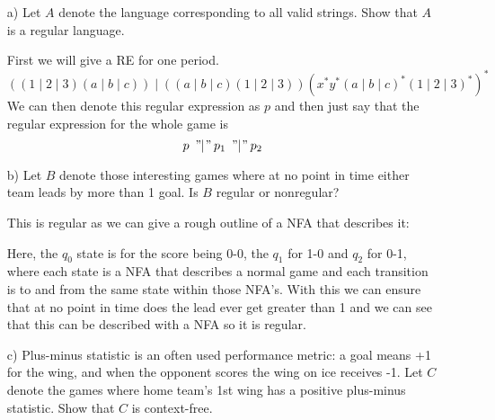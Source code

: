 \documentclass{article}
\begin{document}
	\begin{itemize}
		\item[a)] Let $A$ denote the language corresponding to all valid 
			strings. Show that $A$ is a regular language. 

			First we will give a RE for one period.
			\[
				((1\mid 2\mid 3)(a\mid b\mid c))\mid((a\mid b\mid c)(1\mid 2\mid 3))(x^*y^*(a\mid b\mid c)^*(1\mid 2\mid 3)^*)^*
			\]
			We can then denote this regular expression as $p$ and then just 
			say that the regular expression for the whole game is 
			\[p\hspace{0.5em}"\hspace{-0.3em}\mid\hspace{-0.2em}"\hspace{0.2em}p_1 \hspace{0.5em}"\hspace{-0.3em}\mid\hspace{-0.2em}"\hspace{0.2em}p_2\]
		\item[b)] Let $B$ denote those interesting games where at no point 
			in time either team leads by more than 1 goal. Is $B$ regular 
			or nonregular?

			This is regular as we can give a rough outline of a NFA that 
			describes it:

			\begin{center}
			\end{center}

			Here, the $q_0$ state is for the score being 0-0, the $q_1$ for 
			1-0 and $q_2$ for 0-1, where each state is a NFA that describes 
			a normal game and each transition is to and from the same state 
			within those NFA's. With this we can ensure that at no point in 
			time does the lead ever get greater than 1 and we can see 
			that this can be described with a NFA so it is regular.
		\item[c)] Plus-minus statistic is an often used performance metric: 
			a goal means +1 for the wing, and when the opponent scores the 
			wing on ice receives -1. Let $C$ denote the games where home 
			team's 1st wing has a positive plus-minus statistic. Show that 
			$C$ is context-free.


\end{itemize}
\end{document}
